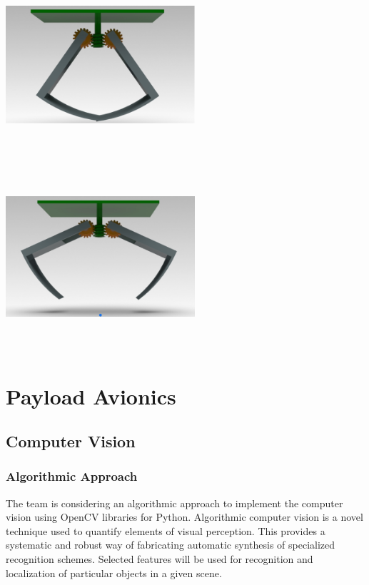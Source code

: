 			\includegraphics[width = 7cm, height = 7cm]{img/PL/worm2.PNG}
			\includegraphics[width = 7cm, height = 7cm]{img/PL/worm1.PNG}
			

\section{Payload Avionics}\label{PL:Tradeoffs:Avionics}
	\subsection{Computer Vision}
		\subsubsection{Algorithmic Approach}
        The team is considering an algorithmic approach to implement the computer vision using OpenCV libraries for Python. Algorithmic computer vision is a novel technique used to quantify elements of visual perception. This provides a systematic and robust way of fabricating automatic synthesis of specialized recognition schemes. Selected features will be used for recognition and localization of particular objects in a given scene. 


